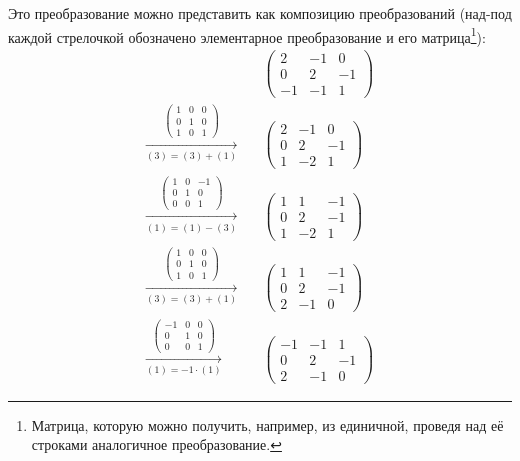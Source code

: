 \documentclass[a4paper,12pt]{article}
\theoremstyle{remark}
\begin{document}
\begin{solution}
    Это преобразование можно представить как композицию преобразований (над-под каждой стрелочкой обозначено элементарное преобразование и его матрица\footnote{Матрица, которую можно получить, например, из единичной, проведя над её строками аналогичное преобразование.}):
    \begin{equation*}
    \begin{split}
      &\begin{pmatrix}
        2 & -1 & 0\\
        0 & 2 & -1\\
        -1 & -1 & 1
      \end{pmatrix}\\
      \xrightarrow[(3) = (3) + (1)]{\left(\begin{smallmatrix}1 & 0 & 0\\0 & 1 & 0\\1 & 0 & 1\end{smallmatrix}\right)}\quad &\begin{pmatrix}
          2 & -1 & 0\\
          0 & 2 & -1\\
          1 & -2 & 1
        \end{pmatrix}\\
      \xrightarrow[(1) = (1) - (3)]{\left(\begin{smallmatrix}1 & 0 & -1\\0 & 1 & 0\\0 & 0 & 1\end{smallmatrix}\right)}\quad &\begin{pmatrix}
          1 & 1 & -1\\
          0 & 2 & -1\\
          1 & -2 & 1
        \end{pmatrix}\\
      \xrightarrow[(3) = (3) + (1)]{\left(\begin{smallmatrix}1 & 0 & 0\\0 & 1 & 0\\1 & 0 & 1\end{smallmatrix}\right)}\quad &\begin{pmatrix}
          1 & 1 & -1\\
          0 & 2 & -1\\
          2 & -1 & 0
        \end{pmatrix}\\
      \xrightarrow[(1) = -1 \cdot (1)]{\left(\begin{smallmatrix}-1 & 0 & 0\\0 & 1 & 0\\0 & 0 & 1\end{smallmatrix}\right)}\quad &\begin{pmatrix}
          -1 & -1 & 1\\
          0 & 2 & -1\\
          2 & -1 & 0
        \end{pmatrix}
    \end{split}
    \end{equation*}
    

\end{solution}
\end{document}

